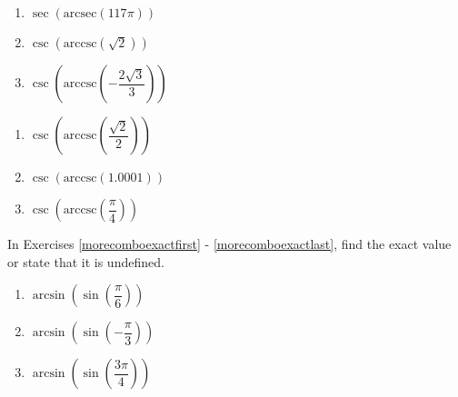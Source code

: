 \documentclass{ximera}
\begin{document}
\begin{multicols}{3}

\begin{enumerate}

\setcounter{enumi}{\value{HW}}

\item $\sec\left(\text{arcsec}\left( 117\pi \right)\right)$ 
\item $\csc\left(\text{arccsc}\left(\sqrt{2}\right)\right)$ 
\item $\csc\left(\text{arccsc}\left(-\dfrac{2\sqrt{3}}{3}\right)\right)$

\setcounter{HW}{\value{enumi}}

\end{enumerate}

\end{multicols}

\begin{multicols}{3}

\begin{enumerate}

\setcounter{enumi}{\value{HW}}

\item $\csc\left(\text{arccsc}\left(\dfrac{\sqrt{2}}{2}\right)\right)$
\item $\csc\left(\text{arccsc}\left(1.0001\right)\right)$ 
\item $\csc\left(\text{arccsc}\left( \dfrac{\pi}{4} \right)\right)$  \label{comboexactlast}

\setcounter{HW}{\value{enumi}}

\end{enumerate}

\end{multicols}

In Exercises \ref{morecomboexactfirst} - \ref{morecomboexactlast}, find the exact value or state that it is undefined.
\enlargethispage{.25in}

\begin{multicols}{3}

\begin{enumerate}

\setcounter{enumi}{\value{HW}}

\item  $\arcsin\left(\sin\left(\dfrac{\pi}{6}\right) \right)$   \label{morecomboexactfirst}
\item  $\arcsin\left(\sin\left(-\dfrac{\pi}{3}\right) \right)$  
\item  $\arcsin\left(\sin\left(\dfrac{3\pi}{4}\right) \right)$

\setcounter{HW}{\value{enumi}}

\end{enumerate}

\end{multicols}
\end{document}
